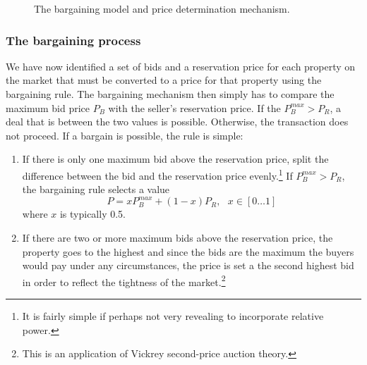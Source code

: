  
\begin{figure}[!thb]
\centering

\caption[The bargaining model and price determination mechanism]{The bargaining model and price determination mechanism.}
\label{fig:Bargaining}
\end{figure}



\subsubsection{The bargaining process}
We have now identified a set of bids and a reservation price for each property on the market that must be converted to a price for that property using the bargaining rule. 
The bargaining  mechanism then simply has to compare the maximum bid price $P_B$ with the seller's reservation price. If the $P_B^{max}>P_R$, a deal that is between the two values is possible. Otherwise, the transaction does not proceed.
If a bargain is possible, the rule is simple: 
\begin{enumerate}
    \item If there is only one maximum bid above the reservation price, split the difference between the bid and the reservation price evenly.\footnote{It is fairly simple if perhaps not very revealing to incorporate relative power. %
    }
    If $P_B^{max}>P_R$,  the bargaining rule selects a value 
    \[P = xP_B^{max}+(1-x)P_R, \ \ \ x\in [0\dots 1] \]
where $x$ is typically 0.5.
    \item If there are two or more maximum bids above the reservation price, the property goes to the highest and since the bids are the maximum the buyers would pay under any circumstances, the price is set a the second highest bid in order to reflect the tightness of the market.\footnote{This is an application of Vickrey \gls{second-price auction} theory\cite{levinAuctionTheory2004}.} 

\end{enumerate}
 



